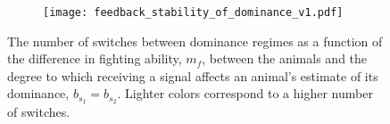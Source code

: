 \documentclass{article}
\begin{document}
\begin{figure}
\begin{subfigure}{.5 \textwidth}
\texttt{[image: feedback\_stability\_of\_dominance\_v1.pdf]}
\caption{}
\end{subfigure}
\caption{\label{diff_switches} The number of switches between dominance regimes as a function of the difference in fighting ability, $m_f$, between the animals and the degree to which receiving a signal affects an animal's estimate of its dominance, $b_{s_1}=b_{s_2}$.  Lighter colors correspond to a higher number of switches.  }
\end{figure}





\nocite{*}


\end{document}
